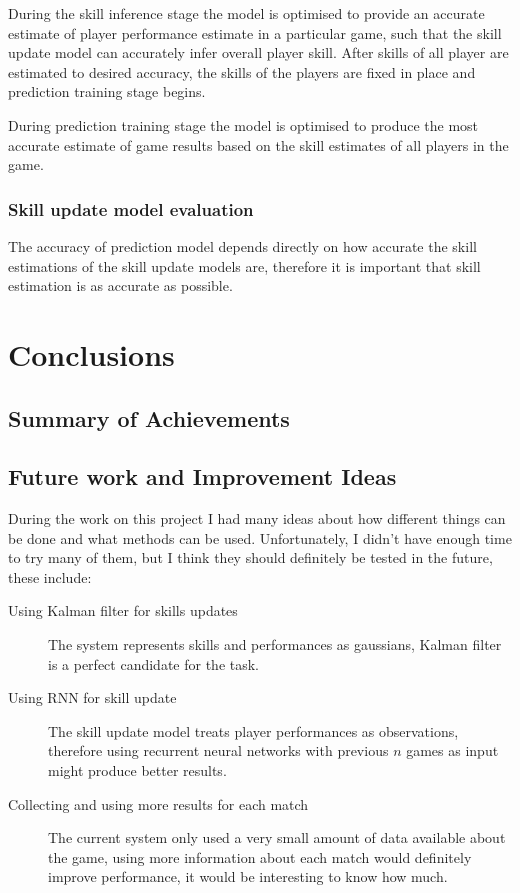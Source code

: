 \documentclass[12pt,a4paper]{book}
\begin{document}
During the skill inference stage the model is optimised to provide an accurate estimate of player performance estimate in a particular game, such that the skill update model can accurately infer overall player skill.
After skills of all player are estimated to desired accuracy, the skills of the players are fixed in place and prediction training stage begins.

During prediction training stage the model is optimised to produce the most accurate estimate of game results based on the skill estimates of all players in the game.

\subsection{Skill update model evaluation}
The accuracy of prediction model depends directly on how accurate the skill estimations of the skill update models are, therefore it is important that skill estimation is as accurate as possible.


\chapter{Conclusions}
\section{Summary of Achievements}
\section{Future work and Improvement Ideas}
During the work on this project I had many ideas about how different things can be done and what methods can be used.
Unfortunately, I didn't have enough time to try many of them, but I think they should definitely be tested in the future, these include:
\begin{description}
\item[Using Kalman filter for skills updates]
The system represents skills and performances as gaussians, Kalman filter is a perfect candidate for the task.

\item[Using RNN for skill update]
The skill update model treats player performances as observations, therefore using recurrent neural networks with previous $n$ games as input might produce better results.

\item[Collecting and using more results for each match]
The current system only used a very small amount of data available about the game, using more information about each match would definitely improve performance, it would be interesting to know how much.
\end{description}
\end{document}
